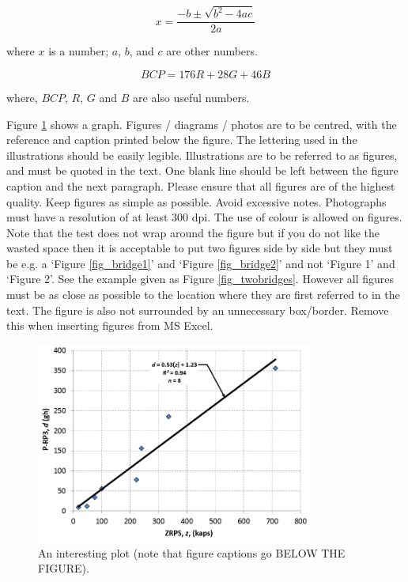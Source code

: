 


\begin{equation}
x = \frac{-b \pm \sqrt{b^2 - 4ac} }{2a}
\end{equation}

where $x$ is a number; $a$, $b$, and $c$ are other numbers.

\begin{equation}
BCP = 176R+28G+46B
\end{equation}

where, $BCP$, $R$, $G$ and $B$ are also useful numbers.

Figure \ref{fig_regression} shows a graph.  Figures / diagrams / photos are to be centred, with the reference and caption printed below the figure. The lettering used in the illustrations should be easily legible.  Illustrations are to be referred to as figures, and must be quoted in the text. One blank line should be left between the figure caption and the next paragraph. Please ensure that all figures are of the highest quality. Keep figures as simple as possible. Avoid excessive notes. Photographs must have a resolution of at least 300 dpi. The use of colour is allowed on figures. Note that the test does not wrap around the figure but if you do not like the wasted space then it is acceptable to put two figures side by side but they must be e.g. a ‘Figure \ref{fig_bridge1}’ and ‘Figure \ref{fig_bridge2}’ and not ‘Figure 1’ and ‘Figure 2’. See the example given as Figure \ref{fig_twobridges}. However all figures must be as close as possible to the location where they are first referred to in the text. The figure is also not surrounded by an unnecessary box/border. Remove this when inserting figures from MS Excel.


\begin{figure}[ht]
\centering
\includegraphics[height=6.6cm]{figures/fig_regression}
\caption{An interesting plot (note that figure captions go BELOW THE FIGURE).}
\label{fig_regression}
\end{figure}


